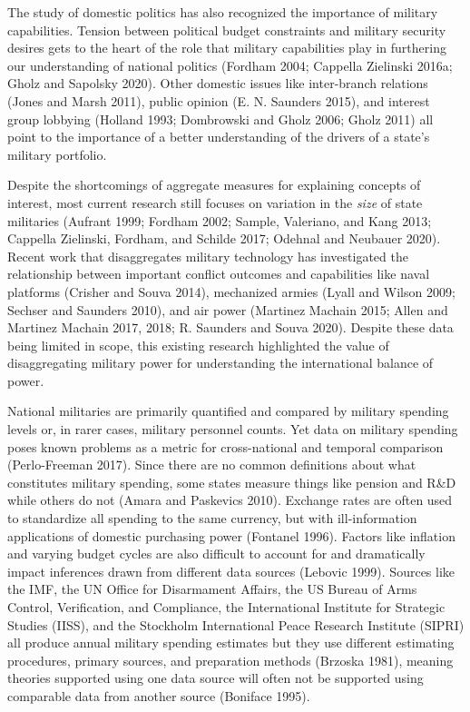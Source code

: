 \documentclass[
]{article}
\begin{document}
The study of domestic politics has also recognized the importance of military capabilities. Tension between political budget constraints and military security desires gets to the heart of the role that military capabilities play in furthering our understanding of national politics (Fordham 2004; Cappella Zielinski 2016a; Gholz and Sapolsky 2020). Other domestic issues like inter-branch relations (Jones and Marsh 2011), public opinion (E. N. Saunders 2015), and interest group lobbying (Holland 1993; Dombrowski and Gholz 2006; Gholz 2011) all point to the importance of a better understanding of the drivers of a state's military portfolio.

Despite the shortcomings of aggregate measures for explaining concepts of interest, most current research still focuses on variation in the \textit{size} of state militaries (Aufrant 1999; Fordham 2002; Sample, Valeriano, and Kang 2013; Cappella Zielinski, Fordham, and Schilde 2017; Odehnal and Neubauer 2020). Recent work that disaggregates military technology has investigated the relationship between important conflict outcomes and capabilities like naval platforms (Crisher and Souva 2014), mechanized armies (Lyall and Wilson 2009; Sechser and Saunders 2010), and air power (Martinez Machain 2015; Allen and Martinez Machain 2017, 2018; R. Saunders and Souva 2020). Despite these data being limited in scope, this existing research highlighted the value of disaggregating military power for understanding the international balance of power.

National militaries are primarily quantified and compared by military spending levels or, in rarer cases, military personnel counts. Yet data on military spending poses known problems as a metric for cross-national and temporal comparison (Perlo-Freeman 2017). Since there are no common definitions about what constitutes military spending, some states measure things like pension and R\&D while others do not (Amara and Paskevics 2010). Exchange rates are often used to standardize all spending to the same currency, but with ill-information applications of domestic purchasing power (Fontanel 1996). Factors like inflation and varying budget cycles are also difficult to account for and dramatically impact inferences drawn from different data sources (Lebovic 1999). Sources like the IMF, the UN Office for Disarmament Affairs, the US Bureau of Arms Control, Verification, and Compliance, the International Institute for Strategic Studies (IISS), and the Stockholm International Peace Research Institute (SIPRI) all produce annual military spending estimates but they use different estimating procedures, primary sources, and preparation methods (Brzoska 1981), meaning theories supported using one data source will often not be supported using comparable data from another source (Boniface 1995).
\end{document}
